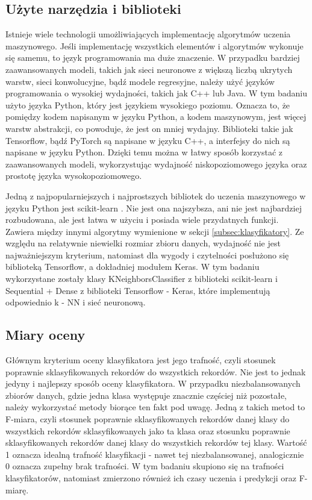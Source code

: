 \subsection{Użyte narzędzia i biblioteki}\label{subsec:narzedziaibiblioteki}
Istnieje wiele technologii umożliwiających implementację algorytmów uczenia maszynowego.
Jeśli implementację wszystkich elementów i algorytmów wykonuje się samemu, to język programowania ma duże znaczenie.
W przypadku bardziej zaawansowanych modeli, takich jak sieci neuronowe z większą liczbą ukrytych warstw, sieci konwolucyjne, bądź modele regresyjne,
należy użyć języków programowania o wysokiej wydajności, takich jak C++ lub Java. W tym badaniu użyto języka Python, który jest językiem wysokiego poziomu.
Oznacza to, że pomiędzy kodem napisanym w języku Python, a kodem maszynowym, jest więcej warstw abstrakcji, co powoduje, że jest on mniej wydajny.
Biblioteki takie jak Tensorflow, bądź PyTorch są napisane w języku C++, a interfejsy do nich są napisane w języku Python. 
Dzięki temu można w łatwy sposób korzystać z zaawansowanych modeli,
wykorzystując wydajność niskopoziomowego języka oraz prostotę języka wysokopoziomowego.

Jedną z najpopularniejszych i najprostszych bibliotek do uczenia maszynowego w języku Python jest scikit-learn \cite{scikit-learn}. Nie jest ona najszybsza, ani nie jest najbardziej rozbudowana,
ale jest łatwa w użyciu i posiada wiele przydatnych funkcji. Zawiera między innymi algorytmy wymienione w sekcji \ref{subsec:klasyfikatory}. Ze względu na relatywnie niewielki rozmiar zbioru danych,
wydajność nie jest najważniejszym kryterium, natomiast dla wygody i czytelności posłużono się biblioteką Tensorflow, 
a dokładniej modułem Keras. W tym badaniu wykorzystane zostały klasy KNeighborsClassifier z biblioteki scikit-learn i Sequential + Dense z biblioteki Tensorflow - Keras, 
które implementują odpowiednio k - NN i sieć neuronową.

\subsection{Miary oceny}\label{subsec:miaryoceny}
Głównym kryterium oceny klasyfikatora jest jego trafność, czyli stosunek poprawnie sklasyfikowanych rekordów do wszystkich rekordów.
Nie jest to jednak jedyny i najlepszy sposób oceny klasyfikatora. W przypadku niezbalansowanych zbiorów danych, gdzie jedna klasa występuje znacznie częściej niż pozostałe,
należy wykorzystać metody biorące ten fakt pod uwagę. Jedną z takich metod to F-miara, czyli stosunek poprawnie sklasyfikowanych rekordów danej klasy do wszystkich rekordów sklasyfikowanych
jako ta klasa oraz stosunku poprawnie sklasyfikowanych rekordów danej klasy do wszystkich rekordów tej klasy. Wartość 1 oznacza idealną trafność klasyfikacji - nawet tej niezbalansowanej, 
analogicznie 0 oznacza zupełny brak trafności. W tym badaniu skupiono się na trafności klasyfikatorów, natomiast zmierzono również ich czasy uczenia i predykcji oraz F-miarę.